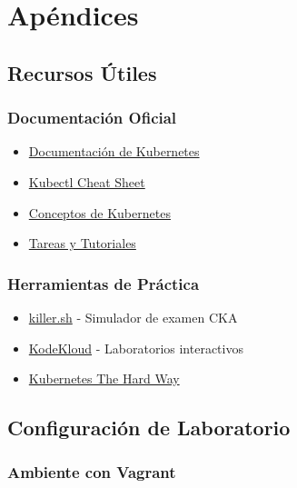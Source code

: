 \documentclass[11pt,a4paper]{article}
\begin{document}
\newpage

\section{Apéndices}

\subsection{Recursos Útiles}

\subsubsection{Documentación Oficial}

\begin{itemize}
    \item \href{https://kubernetes.io/docs/}{Documentación de Kubernetes}
    \item \href{https://kubernetes.io/docs/reference/kubectl/cheatsheet/}{Kubectl Cheat Sheet}
    \item \href{https://kubernetes.io/docs/concepts/}{Conceptos de Kubernetes}
    \item \href{https://kubernetes.io/docs/tasks/}{Tareas y Tutoriales}
\end{itemize}

\subsubsection{Herramientas de Práctica}

\begin{itemize}
    \item \href{https://killer.sh/}{killer.sh} - Simulador de examen CKA
    \item \href{https://kodekloud.com/}{KodeKloud} - Laboratorios interactivos
    \item \href{https://github.com/kelseyhightower/kubernetes-the-hard-way}{Kubernetes The Hard Way}
\end{itemize}

\subsection{Configuración de Laboratorio}

\subsubsection{Ambiente con Vagrant}
\end{document}
